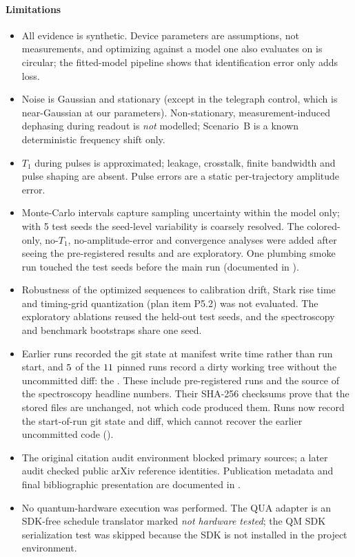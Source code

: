 \paragraph{Limitations}
\begin{itemize}
  \item All evidence is synthetic. Device parameters are assumptions, not measurements, and
    optimizing against a model one also evaluates on is circular; the fitted-model pipeline
    shows that identification error only adds loss.
  \item Noise is Gaussian and stationary (except in the telegraph control, which is near-Gaussian
    at our parameters). Non-stationary, measurement-induced dephasing during readout is
    \emph{not} modelled; Scenario~B is a known deterministic frequency shift only.
  \item $T_1$ during pulses is approximated; leakage, crosstalk, finite bandwidth and pulse
    shaping are absent. Pulse errors are a static per-trajectory amplitude error.
  \item Monte-Carlo intervals capture sampling uncertainty within the model only; with 5 test
    seeds the seed-level variability is coarsely resolved. The colored-only, no-$T_1$,
    no-amplitude-error and convergence analyses were added after seeing the pre-registered
    results and are exploratory. One plumbing smoke run touched the test seeds before the main
    run (documented in ).
  \item Robustness of the optimized sequences to calibration drift, Stark rise time and
    timing-grid quantization (plan item P5.2) was not evaluated. The exploratory ablations reused
    the held-out test seeds, and the spectroscopy and benchmark bootstraps share one seed.
  \item Earlier runs recorded the git state at manifest write time rather than run
    start, and $5$ of the $11$ pinned runs record a dirty
    working tree without the uncommitted diff: the \PinnedRunsDirtyList. These include
    pre-registered runs and the source of the spectroscopy headline numbers. Their SHA-256
    checksums prove that the stored files are unchanged, not which code produced them.
    Runs now record the start-of-run git state and diff, which cannot recover the earlier
    uncommitted code ().
  \item The original citation audit environment blocked primary sources; a later
    audit checked public arXiv reference identities. Publication metadata and
    final bibliographic presentation are documented in .
  \item No quantum-hardware execution was performed. The QUA adapter is an
    SDK-free schedule translator marked \emph{not hardware tested}; the QM SDK serialization
    test was skipped because the SDK is not installed in the project environment.
\end{itemize}

